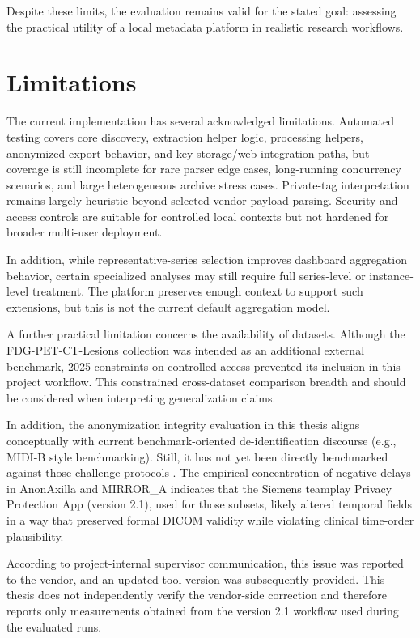 Despite these limits, the evaluation remains valid for the stated goal: assessing the practical utility of a local metadata platform in realistic research workflows.

\section{Limitations}
The current implementation has several acknowledged limitations. Automated testing covers core discovery, extraction helper logic, processing helpers, anonymized export behavior, and key storage/web integration paths, but coverage is still incomplete for rare parser edge cases, long-running concurrency scenarios, and large heterogeneous archive stress cases. Private-tag interpretation remains largely heuristic beyond selected vendor payload parsing. Security and access controls are suitable for controlled local contexts but not hardened for broader multi-user deployment.

In addition, while representative-series selection improves dashboard aggregation behavior, certain specialized analyses may still require full series-level or instance-level treatment. The platform preserves enough context to support such extensions, but this is not the current default aggregation model.

A further practical limitation concerns the availability of datasets. Although the FDG-PET-CT-Lesions collection was intended as an additional external benchmark, 2025 constraints on controlled access prevented its inclusion in this project workflow. This constrained cross-dataset comparison breadth and should be considered when interpreting generalization claims.

In addition, the anonymization integrity evaluation in this thesis aligns conceptually with current benchmark-oriented de-identification discourse (e.g., MIDI-B style benchmarking). Still, it has not yet been directly benchmarked against those challenge protocols \cite{pei2025medicalimagedeidentificationbenchmark}. The empirical concentration of negative delays in AnonAxilla and MIRROR\_A indicates that the Siemens teamplay Privacy Protection App (version 2.1), used for those subsets, likely altered temporal fields in a way that preserved formal DICOM validity while violating clinical time-order plausibility.

According to project-internal supervisor communication, this issue was reported to the vendor, and an updated tool version was subsequently provided. This thesis does not independently verify the vendor-side correction and therefore reports only measurements obtained from the version 2.1 workflow used during the evaluated runs.

